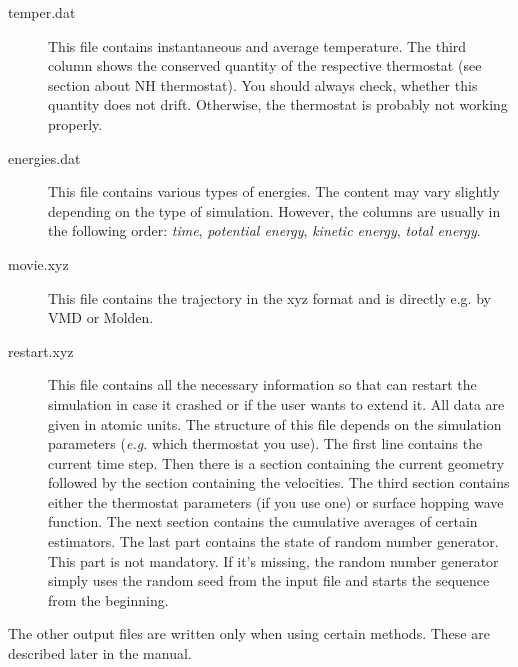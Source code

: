 \begin{description}
\item[temper.dat] This file contains instantaneous and average temperature. The third column shows the conserved quantity of the respective thermostat (see section about NH thermostat). You should always check, whether this quantity does not drift. Otherwise, the thermostat
is probably not working properly.

\item[energies.dat] This file contains various types of energies. The content may vary slightly depending on the type of simulation. However, the columns are usually in the following order: \textit{time}, \textit{potential energy}, \textit{kinetic energy}, \textit{total energy}.

\item[movie.xyz] This file contains the trajectory in the xyz format and is directly e.g. by VMD or Molden.

\item[restart.xyz] This file contains all the necessary information so that \abin can restart the simulation in case it crashed or if the user wants to extend it. All data are given in atomic units. The structure of this file depends on the simulation parameters (\textit{e.g.} which thermostat you use). The first line contains the current time step. Then there is a section containing the current geometry followed by the section containing the velocities. The third section contains either the thermostat parameters (if you use one) or surface hopping wave function. The next section contains the cumulative averages of certain estimators. The last part contains the state of random number generator. This part is not mandatory. If it's missing, the random number generator simply uses the random seed from the input file and starts the sequence from the beginning.


\end{description}

The other output files are written only when using certain methods. These are described later in the manual.

